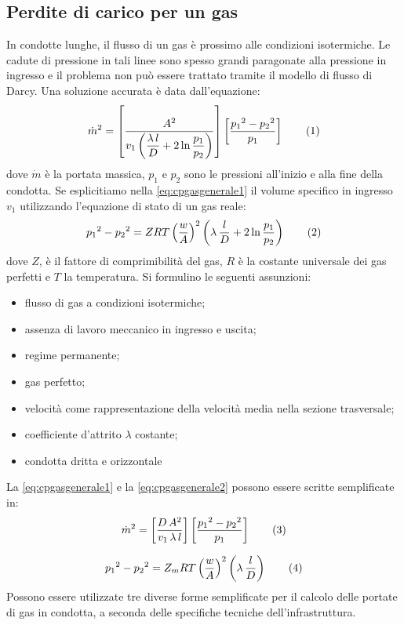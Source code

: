 \subsection{Perdite di carico per un gas}
In condotte lunghe, il flusso di un gas è prossimo alle condizioni isotermiche. Le cadute di pressione in tali linee sono spesso grandi paragonate alla pressione in ingresso e il problema non può essere trattato tramite il modello di flusso di Darcy. Una soluzione accurata è data dall'equazione:
\[\dot{m}^2=\left[\dfrac{A^2}{v_1\left(\dfrac{\lambda\,l}{D}+2\ln\dfrac{p_1}{p_2}\right)}\right]\left[\dfrac{{p_1}^2-{p_2}^2}{p_1}\right] \addtag \label{eq:cpgasgenerale1}\]
dove \(\dot{m}\) è la portata massica, \(p_1\) e \(p_2\) sono le pressioni all'inizio e alla fine della condotta.
Se esplicitiamo nella \eqref{eq:cpgasgenerale1} il volume specifico in ingresso \(v_1\) utilizzando l'equazione di stato di un gas reale:
\[{p_1}^2-{p_2}^2=Z R T \left(\dfrac{w}{A}\right)^2\left(\lambda \, \dfrac{l}{D}+2\ln\dfrac{p_1}{p_2}\right)  \addtag \label{eq:cpgasgenerale2}\]
dove \(Z\),  è il fattore di comprimibilità del gas, \(R\) è la costante universale dei gas perfetti e \(T\) la temperatura.
Si formulino le seguenti assunzioni:
\begin{itemize}
    \item flusso di gas a condizioni isotermiche;
    \item assenza di lavoro meccanico in ingresso e uscita;
    \item regime permanente;
    \item gas perfetto;
    \item velocità come rappresentazione della velocità media nella sezione trasversale;
    \item coefficiente d'attrito \(\lambda\) costante;
    \item condotta dritta e orizzontale
\end{itemize}
La \eqref{eq:cpgasgenerale1} e la \eqref{eq:cpgasgenerale2} possono essere scritte semplificate in:
\[\dot{m}^2=\left[ \dfrac{D \, A^2}{v_1 \, \lambda \, l}\right] \left[\dfrac{{p_1}^2-{p_2}^2}{p_1}\right] \addtag \label{eq:cpgassempl1} \]

\[{p_1}^2-{p_2}^2=Z_m R T \left(\dfrac{w}{A}\right)^2\left(\lambda \, \dfrac{l}{D}\right)  \addtag \label{eq:cpgassempl2}\]
Possono essere utilizzate tre diverse forme semplificate per il calcolo delle portate di gas in condotta, a seconda delle specifiche tecniche dell'infrastruttura.

